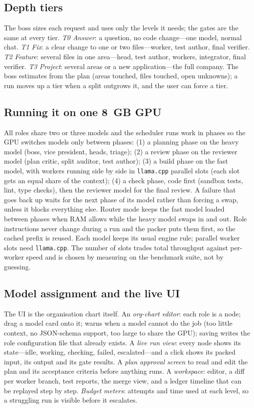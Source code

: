 \subsection{Depth tiers}

The boss sizes each request and uses only the levels it needs; the gates are the same at every tier. \emph{T0 Answer}: a question, no code change---one model, normal chat. \emph{T1 Fix}: a clear change to one or two files---worker, test author, final verifier. \emph{T2 Feature}: several files in one area---head, test author, workers, integrator, final verifier. \emph{T3 Project}: several areas or a new application---the full company. The boss estimates from the plan (areas touched, files touched, open unknowns); a run moves up a tier when a split outgrows it, and the user can force a tier.

\subsection{Running it on one 8~GB GPU}

All roles share two or three models and the scheduler runs work in phases so the GPU switches models only between phases: (1) a planning phase on the heavy model (boss, vice president, heads, triage); (2) a review phase on the reviewer model (plan critic, split auditor, test author); (3) a build phase on the fast model, with workers running side by side in \texttt{llama.cpp} parallel slots (each slot gets an equal share of the context); (4) a check phase, code first (sandbox tests, lint, type checks), then the reviewer model for the final review. A failure that goes back up waits for the next phase of its model rather than forcing a swap, unless it blocks everything else. Router mode keeps the fast model loaded between phases when RAM allows while the heavy model swaps in and out. Role instructions never change during a run and the packer puts them first, so the cached prefix is reused. Each model keeps its usual engine rule; parallel worker slots need \texttt{llama.cpp}. The number of slots trades total throughput against per-worker speed and is chosen by measuring on the benchmark suite, not by guessing.

\subsection{Model assignment and the live UI}

The UI is the organisation chart itself. An \emph{org-chart editor}: each role is a node; drag a model card onto it; \hivi{} warns when a model cannot do the job (too little context, no JSON-schema support, too large to share the GPU); saving writes the role configuration file that already exists. A \emph{live run view}: every node shows its state---idle, working, checking, failed, escalated---and a click shows its packed input, its output and its gate results. A \emph{plan approval screen} to read and edit the plan and its acceptance criteria before anything runs. A \emph{workspace}: editor, a diff per worker branch, test reports, the merge view, and a ledger timeline that can be replayed step by step. \emph{Budget meters}: attempts and time used at each level, so a struggling run is visible before it escalates.

